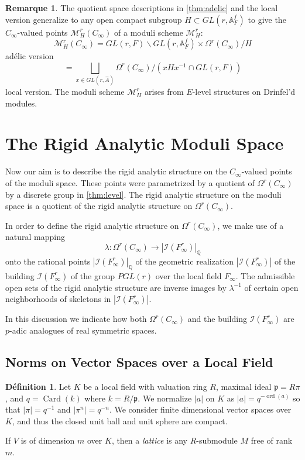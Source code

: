 \documentclass[12pt,a4paper]{article}
\theoremstyle{plain}
\theoremstyle{definition}
\newtheorem{definition}{D\'efinition}[section]
\newtheorem{remark}{Remarque}[section]
\theoremstyle{remark}
\DeclareMathOperator{\Card}{Card}
\DeclareMathOperator{\ord}{ord}
\newcommand{\fp}{\mathfrak{p}}
\newcommand{\cI}{\mathcal{I}}
\newcommand{\bQ}{\mathbb{Q}}
\newcommand{\bA}{\mathbb{A}}
\newcommand{\cM}{\mathcal{M}}
\providecommand{\cI}{\mathcal{I}}
\providecommand{\cM}{\mathcal{M}}
\providecommand{\fp}{\mathfrak{p}}
\begin{document}
\begin{remark}
\label{rem:general}
The quotient space descriptions in \eqref{thm:adelic} and the local version generalize to any open compact subgroup $H \subset GL(r, \bA_F^f)$ to give the $C_\infty$-valued points $\cM_H^r(C_\infty)$ of a moduli scheme $\cM_H^r$:
\[
\cM_H^r(C_\infty) = GL(r, F) \backslash GL(r, \bA_F^f) \times \Omega^r(C_\infty) / H
\]
ad\'elic version
\[
= \bigsqcup_{x \in GL(r, \hat{A})} \Omega^r(C_\infty) / (xHx^{-1} \cap GL(r, F))
\]
local version. The moduli scheme $\cM_H^r$ arises from $E$-level structures on Drinfel'd modules.
\end{remark}

\newpage
\section{The Rigid Analytic Moduli Space}
\label{ch:rigid}

Now our aim is to describe the rigid analytic structure on the $C_\infty$-valued points of the moduli space. These points were parametrized by a quotient of $\Omega^r(C_\infty)$ by a discrete group in \eqref{thm:level}. The rigid analytic structure on the moduli space is a quotient of the rigid analytic structure on $\Omega^r(C_\infty)$.

In order to define the rigid analytic structure on $\Omega^r(C_\infty)$, we make use of a natural mapping
\[
\lambda: \Omega^r(C_\infty) \longrightarrow |\cI(F_\infty^r)|_\bQ
\]
onto the rational points $|\cI(F_\infty^r)|_\bQ$ of the geometric realization $|\cI(F_\infty^r)|$ of the building $\cI(F_\infty^r)$ of the group $PGL(r)$ over the local field $F_\infty$. The admissible open sets of the rigid analytic structure are inverse images by $\lambda^{-1}$ of certain open neighborhoods of skeletons in $|\cI(F_\infty^r)|$.

In this discussion we indicate how both $\Omega^r(C_\infty)$ and the building $\cI(F_\infty^r)$ are $p$-adic analogues of real symmetric spaces.

\subsection{Norms on Vector Spaces over a Local Field}
\label{sec:norms}

\begin{definition}
\label{def:localfield}
Let $K$ be a local field with valuation ring $R$, maximal ideal $\fp = R\pi$, and $q = \Card(k)$ where $k = R/\fp$. We normalize $|a|$ on $K$ as $|a| = q^{-\ord(a)}$ so that $|\pi| = q^{-1}$ and $|\pi^n| = q^{-n}$. We consider finite dimensional vector spaces over $K$, and thus the closed unit ball and unit sphere are compact.

If $V$ is of dimension $m$ over $K$, then a \emph{lattice} is any $R$-submodule $M$ free of rank $m$.
\end{definition}
\end{document}
